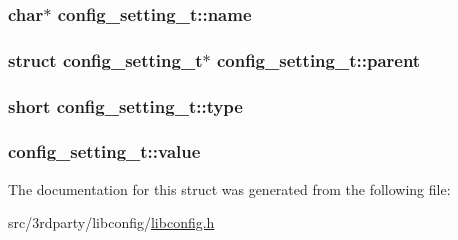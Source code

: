 \label{structconfig__setting__t_a11fc7f855c8200ea53458451d0ef0e9c}
\hypertarget{structconfig__setting__t_a2228af4451498a4961b72dd4dcfe57cb}{
\subsubsection[{name}]{\setlength{\rightskip}{0pt plus 5cm}char$\ast$ {\bf config\_\-setting\_\-t::name}}}
\label{structconfig__setting__t_a2228af4451498a4961b72dd4dcfe57cb}
\hypertarget{structconfig__setting__t_a70368ebbbb3c902adbbcd96606547d7d}{
\subsubsection[{parent}]{\setlength{\rightskip}{0pt plus 5cm}struct {\bf config\_\-setting\_\-t}$\ast$ {\bf config\_\-setting\_\-t::parent}}}
\label{structconfig__setting__t_a70368ebbbb3c902adbbcd96606547d7d}
\hypertarget{structconfig__setting__t_aab8065083de2436448b7b99b46feff18}{
\subsubsection[{type}]{\setlength{\rightskip}{0pt plus 5cm}short {\bf config\_\-setting\_\-t::type}}}
\label{structconfig__setting__t_aab8065083de2436448b7b99b46feff18}
\hypertarget{structconfig__setting__t_a2d217386c7e30456e484151b61ce597f}{
\subsubsection[{value}]{ {\bf config\_\-setting\_\-t::value}}}
\label{structconfig__setting__t_a2d217386c7e30456e484151b61ce597f}


The documentation for this struct was generated from the following file:\begin{DoxyCompactItemize}
\item 
src/3rdparty/libconfig/\hyperlink{libconfig_8h}{libconfig.h}\end{DoxyCompactItemize}

